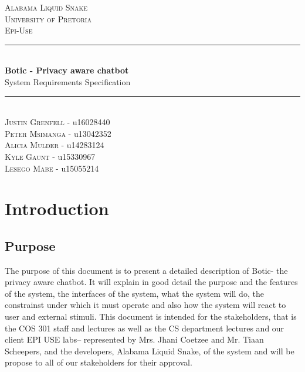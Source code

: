 \documentclass[11pt]{article}
\begin{document}
\renewcommand{\familydefault}{\sfdefault}
\begin{titlepage}
	\newcommand{\HRule}{\rule{\linewidth}{0.5mm}}
	\begin{center}
		            
		\textsc{\LARGE Alabama Liquid Snake}\\[0.8cm]
		\textsc{\Large University of Pretoria}\\[0.5cm]
		\textsc{\large Epi-Use}\\[0.5cm]
		    
		\HRule\\[0.4cm]
		    	
		{\huge\bfseries Botic - Privacy aware chatbot}\\[0.2cm]
		    	
		{\huge System Requirements Specification}\\[0.2cm]
		
		\HRule\\[0.5cm]
		
		\textsc{Justin Grenfell} - u16028440 \\[0cm]
		\textsc{Peter Msimanga} - u13042352 \\[0cm]
		\textsc{Alicia Mulder} - u14283124 \\[0cm]
		\textsc{Kyle Gaunt} - u15330967 \\[0cm]
		\textsc{Lesego Mabe} - u15055214 \\[0cm]
		    
	\end{center}
\end{titlepage}
\tableofcontents
\newpage
\section{Introduction}
\subsection{Purpose}
The purpose of this document is to present a detailed description of Botic- the privacy aware chatbot. It will explain in good detail the purpose and the features of the system, the interfaces of the system, what the system will do, the constrainst under which it must operate and also how the system will react to user and external stimuli. This document is intended for the stakeholders, that is the COS 301 staff and lectures as well as the CS department lectures and our client EPI USE labs-- represented by Mrs. Jhani Coetzee and Mr. Tiaan Scheepers, and the developers, Alabama Liquid Snake, of the system and will be propose to all of our stakeholders for their approval.
\end{document}
